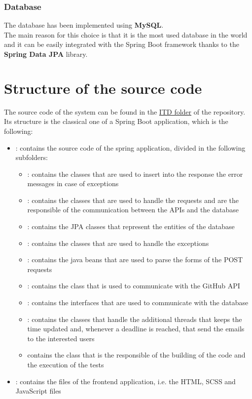 \subsubsection{Database}
The database has been implemented using \textbf{MySQL}.\\
The main reason for this choice is that it is the most used database in the world and it can be easily integrated with the Spring Boot framework thanks to the \textbf{Spring Data JPA} library.

\section{Structure of the source code}

The source code of the system can be found in the \href{https://github.com/pontig/sw-eng-2-PasiniPontiggiaStasi/tree/main/ITD/CodeKataBattle}{ITD folder} of the repository.\\
Its structure is the classical one of a Spring Boot application, which is the following:
\begin{itemize}
    \item {}: contains the source code of the spring application, divided in the following subfolders:
          \begin{itemize}
              \item {}: contains the classes that are used to insert into the response the error messages in case of exceptions
              \item {}: contains the classes that are used to handle the requests and are the responsible of the communication between the APIs and the database
              \item {}: contains the JPA classes that represent the entities of the database
              \item {}: contains the classes that are used to handle the exceptions
              \item {}: contains the java beans that are used to parse the forms of the POST requests
              \item {}: contains the class that is used to communicate with the GitHub API
              \item {}: contains the interfaces that are used to communicate with the database
              \item {}: contains the classes that handle the additional threads that keeps the time updated and, whenever a deadline is reached, that send the emails to the interested users
              \item {} contains the class that is the responsible of the building of the code and the execution of the tests
          \end{itemize}
    \item {}: contains the files of the frontend application, i.e. the HTML, SCSS and JavaScript files
\end{itemize}

